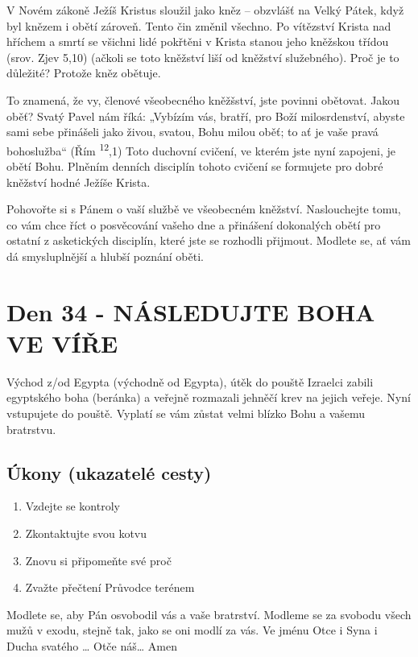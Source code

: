\documentclass[11pt]{article}
\newcommand{\zacatekPatyTyden}{
  Východ z/od Egypta (východně od Egypta), útěk do pouště \newline
  Izraelci zabili egyptského boha (beránka) a veřejně rozmazali jehněčí krev na jejich veřeje. Nyní vstupujete
  do pouště. Vyplatí se vám zůstat velmi blízko Bohu a vašemu bratrstvu.

\subsection*{Úkony (ukazatelé cesty)}
\begin{enumerate}
  \item Vzdejte se kontroly
  \item Zkontaktujte svou kotvu
  \item Znovu si připomeňte své proč
  \item Zvažte přečtení Průvodce terénem
\end{enumerate}
Modlete se, aby Pán osvobodil vás a vaše bratrství. \newline
Modleme se za svobodu všech mužů v exodu, stejně tak, jako se oni modlí za vás.\newline
Ve jménu Otce i Syna i Ducha svatého …  Otče náš… Amen
}
\begin{document}
V Novém zákoně Ježíš Kristus sloužil jako kněz – obzvlášť na Velký Pátek, když byl knězem i obětí zároveň. Tento čin změnil
všechno. Po vítězství Krista nad hříchem a smrtí se všichni lidé pokřtěni v Krista stanou jeho kněžskou třídou (srov. Zjev 5,10)
(ačkoli se toto kněžství liší od kněžství služebného). Proč je to důležité? Protože kněz obětuje.

To znamená, že vy, členové všeobecného kněžšství, jste povinni obětovat. Jakou oběť? Svatý Pavel nám říká: „Vybízím vás, bratří,
pro Boží milosrdenství, abyste sami sebe přinášeli jako živou, svatou, Bohu milou oběť; to ať je vaše pravá bohoslužba“ (Řím
\textsuperscript{12},1) Toto duchovní cvičení, ve kterém jste nyní zapojeni, je obětí Bohu. Plněním denních disciplín tohoto cvičení se formujete pro
dobré kněžství hodné Ježíše Krista.

Pohovořte si s Pánem o vaší službě ve všeobecném kněžství. Naslouchejte tomu, co vám chce říct o posvěcování vašeho dne a
přinášení dokonalých obětí pro ostatní z asketických disciplín, které jste se rozhodli přijmout. Modlete se, ať vám dá smysluplnější
a hlubší poznání oběti.

\newpage
\section{Den 34 - NÁSLEDUJTE BOHA VE VÍŘE}
\zacatekPatyTyden
\end{document}
